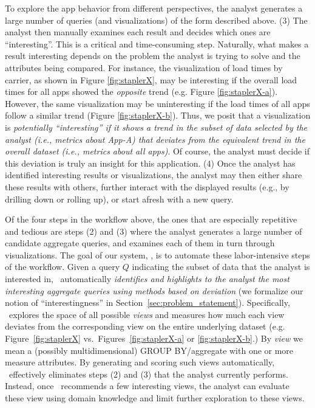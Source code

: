 To explore the app behavior from different perspectives, the analyst generates
a large number of queries (and visualizations) of the form described above.
(3) The analyst then manually examines each result and decides
which ones are ``interesting''. This is a critical and time-consuming step.
Naturally, what makes a result interesting depends on the 
problem the analyst is trying to solve and the
attributes being compared.
For instance, the visualization of load times by carrier, as shown in Figure
\ref{fig:staplerX}, may be interesting if the overall load times for all
apps showed the {\it opposite} trend (e.g. Figure \ref{fig:staplerX-a}).
However, the same visualization may be uninteresting if the load times of all apps
follow a similar trend (Figure \ref{fig:staplerX-b}).
Thus, we posit that  a visualization is {\em potentially ``interesting'' if it shows 
a trend in the subset of data selected by the analyst
(i.e., metrics about App-A)
that deviates from the equivalent trend in the overall dataset (i.e., metrics
about all apps)}.
Of course, the analyst must decide if this deviation 
is truly an insight for this application.
(4) Once the analyst has identified interesting results or
visualizations, the analyst may
then either share these results with others, further interact with
the displayed results (e.g., by drilling down or rolling up), or
start afresh with a new query.


Of the four steps in the workflow above, the 
ones that are especially repetitive and tedious are steps (2) and (3)
where the analyst generates a large number of candidate aggregate queries, 
and examines each
of them in turn through visualizations.
The goal of our system, \SeeDB, is to automate these 
labor-intensive steps of the workflow. 
Given a query $Q$ indicating the subset
of data that the analyst is interested in, \SeeDB\ automatically {\em
identifies and highlights to the analyst the most interesting aggregate queries
using methods based on deviation} (we formalize our notion of ``interestingness'' in Section~\ref{sec:problem_statement}).
Specifically, \SeeDB\ explores the space of all possible {\it views} and
measures how much each view deviates from the corresponding view on the entire underlying dataset (e.g. Figure~\ref{fig:staplerX} vs.~Figures~\ref{fig:staplerX-a} or \ref{fig:staplerX-b}.) 
By {\it view} we mean a (possibly multidimensional) GROUP BY/aggregate with one or more
measure attributes.
By generating and
scoring such views automatically, \SeeDB\ effectively eliminates
steps (2) and (3) that the analyst currently performs. 
Instead, once \SeeDB\
recommends a few interesting views, the analyst can evaluate these
view using domain knowledge and limit further
exploration to these views.  

